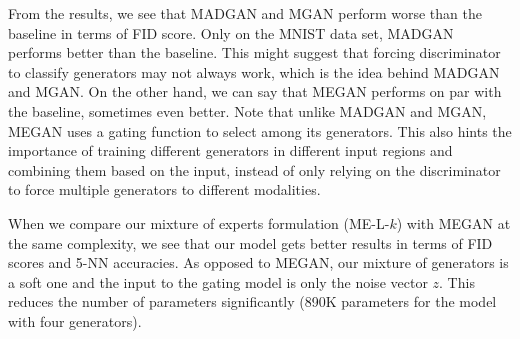 \documentclass[a4paper,onesided,12pt]{report}
\begin{document}
From the results, we see that MADGAN and MGAN perform worse than the baseline in terms of FID score. Only on the MNIST data set, MADGAN performs better than the baseline. This might suggest that forcing discriminator to classify generators may not always work, which is the idea behind MADGAN and MGAN. On the other hand, we can say that MEGAN performs on par with the baseline, sometimes even better. Note that unlike MADGAN and MGAN, MEGAN uses a gating function to select among its generators. This also hints the importance of training different generators in different input regions and combining them based on the input, instead of only relying on the discriminator to force multiple generators to different modalities.

When we compare our mixture of experts formulation (ME-L-$k$) with MEGAN at the same complexity, we see that our model gets better results in terms of FID scores and 5-NN accuracies. As opposed to MEGAN, our mixture of generators is a soft one and the input to the gating model is only the noise vector $z$. This reduces the number of parameters significantly (890K parameters for the model with four generators).
\end{document}
